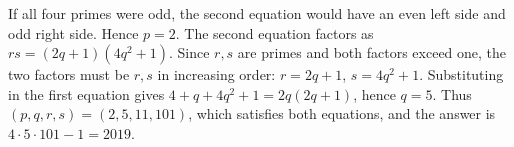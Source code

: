 If all four primes were odd, the second equation would have an even left side and odd right side. Hence $p=2$. The second equation factors as $rs=(2q+1)(4q^2+1)$. Since $r,s$ are primes and both factors exceed one, the two factors must be $r,s$ in increasing order: $r=2q+1$, $s=4q^2+1$. Substituting in the first equation gives $4+q+4q^2+1=2q(2q+1)$, hence $q=5$. Thus $(p,q,r,s)=(2,5,11,101)$, which satisfies both equations, and the answer is $\boxed{4\cdot5\cdot101-1=2019}$.
